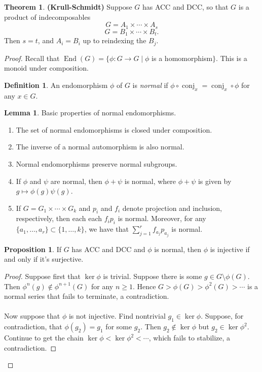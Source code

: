 \documentclass[10pt,letterpaper,cm]{nupset}
\theoremstyle{definition}
\newtheorem*{definition}{Definition}
\newtheorem{prop}{Proposition}
\newtheorem{theorem}{Theorem}
\newtheorem{lemma}{Lemma}
\newcommand{\1}{\mathbf{1}}
\newcommand{\0}{\vec 0}
\DeclareMathOperator{\conj}{conj}
\DeclareMathOperator{\ed}{End}
\begin{document}
\begin{theorem}{\textbf{(Krull-Schmidt)}}
Suppose $G$ has ACC and DCC, so that $G$ is a product of indecomposables $$G = A_1 \times \cdots \times A_s$$ $$G = B_1 \times \cdots \times B_t.$$ Then $s=t$, and $A_i = B_i$ up to reindexing the $B_j$.
\end{theorem}
\begin{proof}
Recall that $\ed(G) = \{\phi : G \to G \mid \phi$ is a homomorphism$\}$. This is a monoid under composition.
\begin{definition}
An endomorphism $\phi$ of $G$ is \textit{normal} if $\phi \circ \conj_x = \conj_x \circ \phi$ for any $x\in G$.
\end{definition}
\begin{lemma} Basic properties of normal endomorphisms.
\begin{enumerate}
\item The set of normal endomorphisms is closed under composition.
\item The inverse of a normal automorphism is also normal.
\item Normal endomorphisms preserve normal subgroups.
\item If $\phi$ and $\psi$ are normal, then $\phi + \psi$ is normal, where $\phi + \psi$ is given by $g\mapsto \phi(g)\psi(g)$.
\item If $G = G_1 \times \cdots \times G_k$ and $p_i$ and $f_i$ denote projection and inclusion, respectively, then each each $f_ip_i$ is normal. Moreover, for any $\{a_1, \ldots, a_r\} \subset \{1, \ldots, k\}$, we have that $\sum_{j=1}^r f_{a_j}p_{a_j}$ is normal.
\end{enumerate}
\end{lemma}
\begin{prop}
If $G$ has ACC and DCC and $\phi$ is normal, then $\phi$ is injective if and only if it's surjective.
\end{prop}
\begin{proof}
Suppose first that $\ker \phi$ is trivial. Suppose there is some $g \in G \setminus \phi(G)$.  Then $\phi^n(g) \notin \phi^{n+1}(G)$ for any $n \geq 1$. Hence $G > \phi(G) > \phi^2(G) > \cdots$ is a normal series that fails to terminate, a contradiction. \\ \\ Now suppose that $\phi$ is not injective. Find nontrivial $g_1 \in \ker \phi$. Suppose, for contradiction, that $\phi(g_2) = g_1$ for some $g_2$. Then $g_2 \notin \ker \phi$ but $g_2 \in \ker \phi^2$. Continue to get the chain $\ker \phi < \ker \phi^2 < \cdots$, which fails to stabilize, a contradiction. 
\end{proof}


\end{proof}
\end{document}
